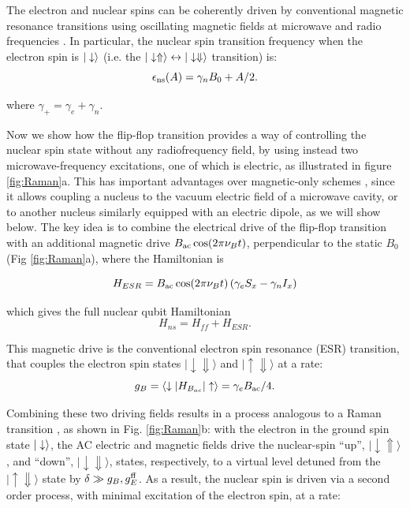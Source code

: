 The electron and nuclear spins can be coherently driven by conventional magnetic resonance transitions using oscillating magnetic fields at microwave \cite{Pla2012} and radio frequencies \cite{Pla2013}. In particular, the nuclear spin transition frequency when the electron spin is $|\downarrow\rangle$ (i.e. the $|\downarrow \Uparrow\rangle \leftrightarrow |\downarrow \Downarrow\rangle$ transition) is:
\begin{equation} \label{eq:epsilon_ns}
\epsilon_{\rm ns}(A) = \gamma_nB_0 + A/2.
\end{equation}

where $\gamma_+ = \gamma_e + \gamma_n$. 

Now we show how the flip-flop transition provides a way of controlling the nuclear spin state without any radiofrequency field, by using instead two microwave-frequency excitations, one of which is electric, as illustrated in figure \ref{fig:Raman}a. This has important advantages over magnetic-only schemes \cite{Morton2008,Freer2017}, since it allows coupling a nucleus to the vacuum electric field of a microwave cavity, or to another nucleus similarly equipped with an electric dipole, as we will show below. The key idea is to combine the electrical drive of the flip-flop transition with an additional magnetic drive $B_{\rm ac}\cos(2\pi\nu_Bt)$, perpendicular to the static $B_0$ (Fig \ref{fig:Raman}a), where the Hamiltonian is 

\begin{equation}
H_{ESR}=B_{\rm ac}\cos(2\pi\nu_Bt)\left(\gamma_e S_x-\gamma_n I_x\right)
\end{equation}

which gives the full nuclear qubit Hamiltonian
\begin{equation}
H_{ns}=H_{ff}+H_{ESR}.
\end{equation}

 This magnetic drive is the conventional electron spin resonance (ESR) transition, that couples the electron spin states $\lvert\downarrow\Downarrow\rangle$ and $\lvert\uparrow\Downarrow\rangle$ at a rate:
\begin{equation}
g_{B}=\langle \downarrow|H_{B_{ac}}|\uparrow\rangle= \gamma_eB_{\rm ac}/4.
\end{equation}

Combining these two driving fields results in a process analogous to a Raman transition \cite{Kok2010}, as shown in Fig. \ref{fig:Raman}b: with the electron in the ground spin state $|\downarrow\rangle$, the AC electric and magnetic fields drive the nuclear-spin ``up'', $\lvert\downarrow\Uparrow\rangle$, and ``down'', $\lvert\downarrow\Downarrow\rangle$, states, respectively, to a virtual level detuned from the $\lvert\uparrow\Downarrow\rangle$ state by $\delta\gg g_B,g_E^{\rm ff}$. As a result, the nuclear spin is driven via a second order process, with minimal excitation of the electron spin, at a rate:


